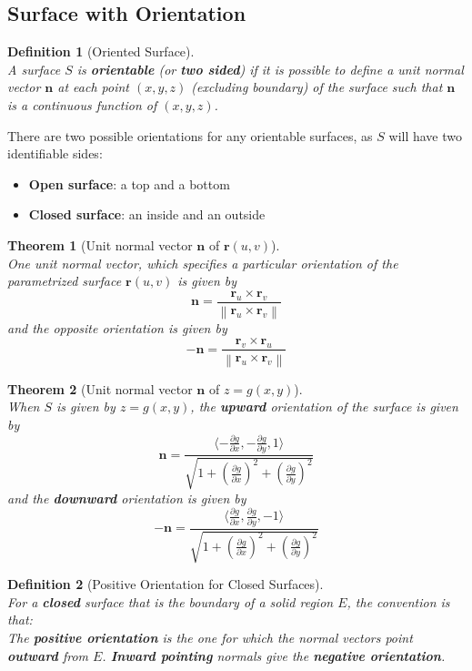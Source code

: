 \documentclass[12pt]{article}
\newcommand\norm[1]{\left\lVert#1\right\rVert}
\newtheorem{definition}{Definition}[section]
\newtheorem{theorem}{Theorem}[section]
\theoremstyle{definition}
\begin{document}
\subsection{Surface with Orientation}
\begin{definition}[Oriented Surface]\hfill\\\normalfont A surface $S$ is \textbf{orientable} (or \textbf{two sided}) if it is possible to define a unit normal vector $\mathbf{n}$ at each point $(x,y,z)$ (excluding boundary) of the surface such that $\mathbf{n}$ is a continuous function of $(x,y,z)$.
\end{definition}
There are two possible orientations for any orientable surfaces, as $S$ will have two identifiable sides:
\begin{itemize}
  \item \textbf{Open surface}: a top and a bottom
  \item \textbf{Closed surface}: an inside and an outside
\end{itemize}
\begin{theorem}[Unit normal vector {$\mathbf{n}$} of {$\mathbf{r}(u,v)$}]
\hfill\\\normalfont One unit normal vector, which specifies a particular orientation of the parametrized surface $\mathbf{r}(u,v)$ is given by
\[
\mathbf{n}=\frac{\mathbf{r}_u\times \mathbf{r}_v}{\norm{\mathbf{r}_u\times \mathbf{r}_v}}
\]
and the opposite orientation is given by
\[
-\mathbf{n}=\frac{\mathbf{r}_v\times\mathbf{r}_u}{\norm{\mathbf{r}_u\times \mathbf{r}_v}}
\]
\end{theorem}
\begin{theorem}[Unit normal vector {$\mathbf{n}$} of {$z=g(x,y)$}]
\hfill\\\normalfont When $S$ is given by $z=g(x,y)$, the \textbf{upward} orientation of the surface is given by
\[
\mathbf{n}=\frac{\langle-\frac{\partial g}{\partial x},-\frac{\partial g}{\partial y}, 1 \rangle}{\sqrt{1+\left(\frac{\partial g}{\partial x}\right)^2+\left(\frac{\partial g}{\partial y}\right)^2}}
\]
and the \textbf{downward} orientation is given by 
\[
-\mathbf{n}=\frac{\langle\frac{\partial g}{\partial x},\frac{\partial g}{\partial y}, -1 \rangle}{\sqrt{1+\left(\frac{\partial g}{\partial x}\right)^2+\left(\frac{\partial g}{\partial y}\right)^2}}
\]
\end{theorem}
\begin{definition}[Positive Orientation for Closed Surfaces]\hfill\\\normalfont For a \textbf{closed} surface that is the boundary of a solid region $E$, the convention is that:\\The \textbf{positive orientation} is the one for which the normal vectors point \textbf{outward} from $E$. \textbf{Inward pointing} normals give the \textbf{negative orientation}.
\end{definition}
\end{document}
